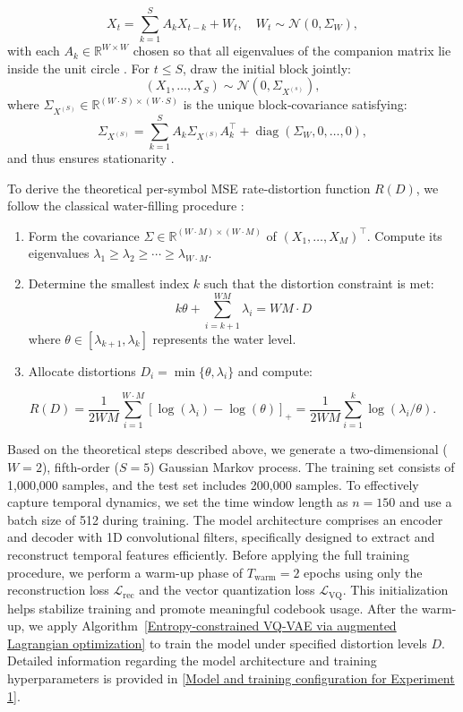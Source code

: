 \documentclass[12pt,review,authoryear]{elsarticle}
\theoremstyle{upright}
\begin{document}
$$
X_t=\sum_{k=1}^S A_k X_{t-k}+W_t, \quad W_t \sim \mathcal{N}\left(0, \Sigma_W\right),
$$
with each $A_k\in\mathbb{R}^{W\times W}$ chosen so that all eigenvalues of the companion matrix lie inside the unit circle \citep{brockwell1991time,hamilton2020time}.
For $t \le S$, draw the initial block jointly:
$$
\left(X_1, \ldots, X_S\right) \sim \mathcal{N}\left(0, \Sigma_{X^{(s)}}\right),
$$
where $\Sigma_{X^{(S)}}\in\mathbb{R}^{(W\cdot S)\times (W\cdot S)}$ is the unique block‐covariance satisfying:
$$
\Sigma_{X^{(S)}}=\sum_{k=1}^S A_k \Sigma_{X^{(S)}} A_k^{\top}+\operatorname{diag}\left(\Sigma_W, 0, \ldots, 0\right),
$$
and thus ensures stationarity \citep{brockwell1991time,hamilton2020time}.

To derive the theoretical per-symbol MSE rate-distortion function $R(D)$, we follow the classical water-filling procedure \citep{cover1999elements}:
\begin{enumerate}
    \item Form the covariance $\Sigma\in\mathbb{R}^{(W \cdot M)\times(W \cdot M)}$ of $(X_1,\dots,X_M)^\top$.  Compute its eigenvalues $\lambda_1\ge\lambda_2\ge\cdots\ge\lambda_{W\cdot M}$.
    \item Determine the smallest index $k$ such that the distortion constraint is met:
    $$
    k \theta+\sum_{i=k+1}^{W M} \lambda_i=W M \cdot D
    $$ 
    where $\theta \in\left[\lambda_{k+1}, \lambda_k\right]$ represents the water level.
    \item Allocate distortions $D_i = \min\{\theta,\lambda_i\}$ and compute:
\end{enumerate}
$$
R(D)=\frac{1}{2 W M} \sum_{i=1}^{W \cdot M}\left[\log \left(\lambda_i\right)-\log (\theta)\right]_{+}=\frac{1}{2 W M} \sum_{i=1}^k \log \left(\lambda_i / \theta\right).
$$

Based on the theoretical steps described above, we generate a two-dimensional (\(W=2\)), fifth-order (\(S=5\)) Gaussian Markov process. The training set consists of 1,000,000 samples, and the test set includes 200,000 samples. To effectively capture temporal dynamics, we set the time window length as \(n=150\) and use a batch size of 512 during training. The model architecture comprises an encoder and decoder with 1D convolutional filters, specifically designed to extract and reconstruct temporal features efficiently. Before applying the full training procedure, we perform a warm-up phase of \(T_{\text{warm}} = 2\) epochs using only the reconstruction loss \(\mathcal{L}_{\text{rec}}\) and the vector quantization loss \(\mathcal{L}_{\mathrm{VQ}}\). This initialization helps stabilize training and promote meaningful codebook usage. After the warm-up, we apply Algorithm~\ref{Entropy-constrained VQ-VAE via augmented Lagrangian optimization} to train the model under specified distortion levels \(D\). Detailed information regarding the model architecture and training hyperparameters is provided in  \ref{Model and training configuration for Experiment 1}.
\end{document}
